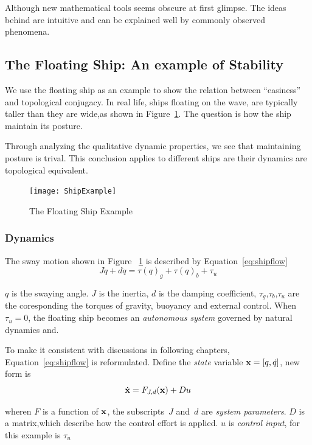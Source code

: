 Although new mathematical tools seems obscure at first glimpse.
The ideas behind are intuitive and can be explained well by commonly observed phenomena.



\subsection{The Floating Ship: An example of Stability}
We use the floating ship as an example to show the relation between ``easiness'' and topological conjugacy.
In real life, ships floating on the wave, are typically taller than they are wide,as shown in Figure~\ref{fig:ShipFloating}.
The  question is how the ship maintain its posture.

Through analyzing the qualitative dynamic properties, we see that maintaining posture is trival.
This conclusion applies to different ships are their dynamics are topological equivalent.


\begin{figure}[!htbp]
  \begin{center}
    \texttt{[image: ShipExample]}
    \caption{The Floating Ship Example}
    \label{fig:ShipFloating}
  \end{center}
\end{figure}

\subsubsection*{Dynamics}
The sway motion shown in Figure ~\ref{fig:ShipFloating} is described by Equation~\ref{eq:shipflow}
\begin{equation}
\label{eq:shipflow}
J\ddot{q}+d\dot{q}=\tau(q)_{g}+\tau(q)_{b}+\tau_{u}
\end{equation}

$q$ is the swaying angle.
$J$ is the inertia,  
$d$ is the damping coefficient,
$\tau_{g}$,$\tau_{b}$,$\tau_{u}$ are the coresponding the torques of gravity, buoyancy and external control.
When $\tau_{u}=0$,  the floating ship  becomes an \emph{autonomous system} governed by natural dynamics and.

To make it consistent with discussions in following chapters, Equation~\ref{eq:shipflow} is reformulated.
Define the \emph{state} variable $\mathbf{x}=[q,\dot{q}]$, new form is
\[
\dot{\mathbf{x}}=F_{J,d}(\mathbf{x})+Du
\]

wheren 
$F$ is a function of $\mathbf{x}$, the subscripts~$J$ and~$d$ are \emph{system parameters}.
$D$ is a matrix,which describe how the control effort is applied.
$u$ is \emph{control input}, for this example is $\tau_{u}$



